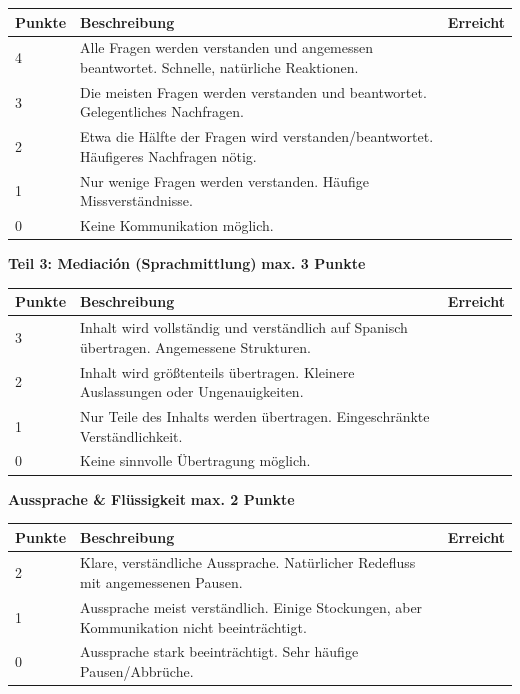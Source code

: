 \documentclass[11pt, a4paper]{article}
\begin{document}
\vspace{4pt}

\begin{tabularx}{\textwidth}{|p{1.2cm}|X|p{1.5cm}|}
\hline
\rowcolor{hellgrau}
\textbf{Punkte} & \textbf{Beschreibung} & \textbf{Erreicht} \\
\hline
4 & Alle Fragen werden verstanden und angemessen beantwortet. Schnelle, natürliche Reaktionen. & \\
\hline
3 & Die meisten Fragen werden verstanden und beantwortet. Gelegentliches Nachfragen. & \\
\hline
2 & Etwa die Hälfte der Fragen wird verstanden/beantwortet. Häufigeres Nachfragen nötig. & \\
\hline
1 & Nur wenige Fragen werden verstanden. Häufige Missverständnisse. & \\
\hline
0 & Keine Kommunikation möglich. & \\
\hline
\end{tabularx}

\vspace{12pt}

\textbf{\large Teil 3: Mediación (Sprachmittlung)} \hfill \textbf{max. 3 Punkte}

\vspace{4pt}

\begin{tabularx}{\textwidth}{|p{1.2cm}|X|p{1.5cm}|}
\hline
\rowcolor{hellgrau}
\textbf{Punkte} & \textbf{Beschreibung} & \textbf{Erreicht} \\
\hline
3 & Inhalt wird vollständig und verständlich auf Spanisch übertragen. Angemessene Strukturen. & \\
\hline
2 & Inhalt wird größtenteils übertragen. Kleinere Auslassungen oder Ungenauigkeiten. & \\
\hline
1 & Nur Teile des Inhalts werden übertragen. Eingeschränkte Verständlichkeit. & \\
\hline
0 & Keine sinnvolle Übertragung möglich. & \\
\hline
\end{tabularx}

\vspace{12pt}

\textbf{\large Aussprache \& Flüssigkeit} \hfill \textbf{max. 2 Punkte}

\vspace{4pt}

\begin{tabularx}{\textwidth}{|p{1.2cm}|X|p{1.5cm}|}
\hline
\rowcolor{hellgrau}
\textbf{Punkte} & \textbf{Beschreibung} & \textbf{Erreicht} \\
\hline
2 & Klare, verständliche Aussprache. Natürlicher Redefluss mit angemessenen Pausen. & \\
\hline
1 & Aussprache meist verständlich. Einige Stockungen, aber Kommunikation nicht beeinträchtigt. & \\
\hline
0 & Aussprache stark beeinträchtigt. Sehr häufige Pausen/Abbrüche. & \\
\hline
\end{tabularx}
\end{document}
